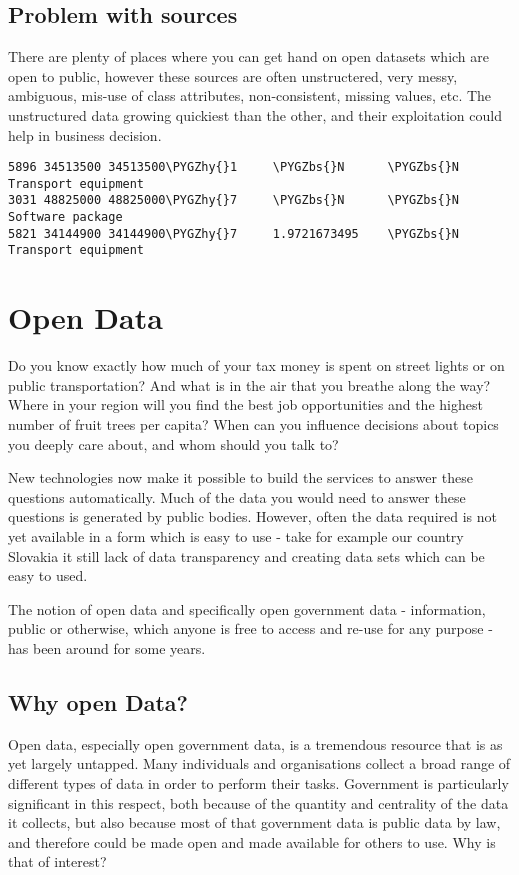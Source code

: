 \documentclass[letterpaper,12pt,oneside]{sphinxmanual}
\def\PYGZbs{\char`\\}
\def\PYGZhy{\char`\-}
\begin{document}
\subsection{Problem with sources}
\label{introduction:problem-with-sources}
There are plenty of places where you can get hand on open datasets which are open to public, however these
sources are often unstructered, very messy, ambiguous, mis-use of class attributes, non-consistent, missing values,
etc. The unstructured data growing quickiest than the other, and their exploitation could help in business decision.

\def\SphinxLiteralBlockLabel{\label{introduction:example-of-unstructed-data}}
\begin{Verbatim}[commandchars=\\\{\}]
5896 34513500 34513500\PYGZhy{}1     \PYGZbs{}N      \PYGZbs{}N Transport equipment
3031 48825000 48825000\PYGZhy{}7     \PYGZbs{}N      \PYGZbs{}N      Software package
5821 34144900 34144900\PYGZhy{}7     1.9721673495    \PYGZbs{}N      Transport equipment
\end{Verbatim}
\let\SphinxLiteralBlockLabel\empty


\section{Open Data}
\label{introduction:open-data}
Do you know exactly how much of your tax money is spent on street lights or on public transportation? And what is in the air that you breathe along the way? Where in your region will you find the best job opportunities and the highest number of fruit trees per
capita? When can you influence decisions about topics you deeply care about, and whom should you talk to?

New technologies now make it possible to build the services to answer these questions automatically. Much of the data you would need to answer these questions is generated by public bodies. However, often the data required is not yet available in a form which is easy to use - take for example our country Slovakia it still lack of data transparency and creating data sets which can be easy to used.

The notion of open data and specifically open government data - information, public or otherwise, which anyone is free to access and re-use for any purpose - has been around for some years.


\subsection{Why open Data?}
\label{introduction:why-open-data}
Open data, especially open government data, is a tremendous resource that is as yet largely untapped. Many individuals and organisations collect a broad range of different types of data in order to perform their tasks. Government is particularly significant in this respect, both because of the quantity and centrality of the data it collects, but also because most of that government data is public data by law, and therefore could be made open and made available for others to use. Why is that of interest?
\end{document}

